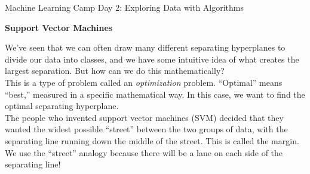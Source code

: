\documentclass[10pt]{article}
\newcommand{\headerclass}{Machine Learning Camp}
\newcommand{\headersection}{Day 2: Exploring Data with Algorithms}
\newcommand{\headertitle}{Support Vector Machines}
\begin{document}
\headerclass\xspace {} \headersection\\
\begin{center}{ \large \textbf{\headertitle} }\end{center}

We've seen that we can often draw many different separating hyperplanes to divide our data into classes, and we have some intuitive idea of what creates the largest separation. But how can we do this mathematically?\\

This is a type of problem called an \textit{optimization} problem. ``Optimal'' means ``best,'' measured in a specific mathematical way. In this case, we want to find the optimal separating hyperplane.\\

The people who invented support vector machines (SVM) decided that they wanted the widest possible ``street'' between the two groups of data, with the separating line running down the middle of the street. This is called the margin. We use the ``street'' analogy because there will be a lane on each side of the separating line!\\
\end{document}
